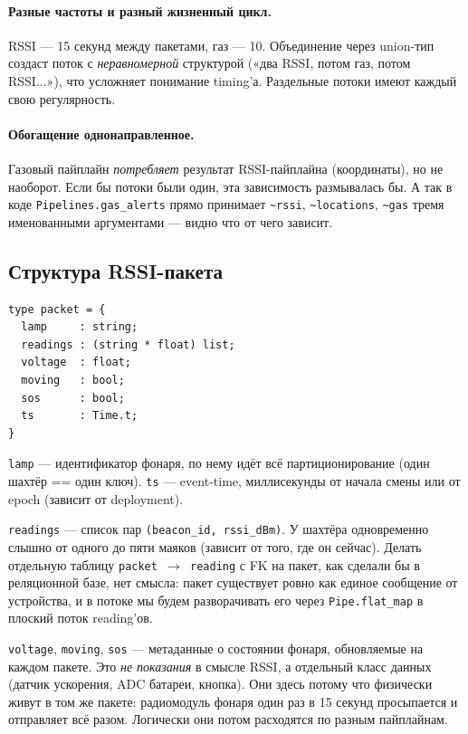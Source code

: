 \paragraph{Разные частоты и разный жизненный цикл.} RSSI --- 15 секунд
между пакетами, газ --- 10. Объединение через union-тип создаст
поток с \emph{неравномерной} структурой («два RSSI, потом газ, потом
RSSI...»), что усложняет понимание timing'а. Раздельные потоки имеют
каждый свою регулярность.

\paragraph{Обогащение однонаправленное.} Газовый пайплайн
\emph{потребляет} результат RSSI-пайплайна (координаты), но не
наоборот. Если бы потоки были один, эта зависимость размывалась бы.
А так в коде \texttt{Pipelines.gas\_alerts} прямо принимает
\texttt{\textasciitilde rssi}, \texttt{\textasciitilde locations},
\texttt{\textasciitilde gas} тремя именованными аргументами ---
видно что от чего зависит.

\subsection{Структура RSSI-пакета}

\begin{lstlisting}
type packet = {
  lamp     : string;
  readings : (string * float) list;
  voltage  : float;
  moving   : bool;
  sos      : bool;
  ts       : Time.t;
}
\end{lstlisting}

\texttt{lamp} --- идентификатор фонаря, по нему идёт всё
партиционирование (один шахтёр == один ключ). \texttt{ts} ---
event-time, миллисекунды от начала смены или от epoch (зависит от
deployment).

\texttt{readings} --- список пар \texttt{(beacon\_id, rssi\_dBm)}. У
шахтёра одновременно слышно от одного до пяти маяков (зависит от
того, где он сейчас). Делать отдельную таблицу
\texttt{packet $\to$ reading} с FK на пакет, как сделали бы в
реляционной базе, нет смысла: пакет существует ровно как единое
сообщение от устройства, и в потоке мы будем разворачивать его
через \texttt{Pipe.flat\_map} в плоский поток reading'ов.

\texttt{voltage}, \texttt{moving}, \texttt{sos} --- метаданные о
состоянии фонаря, обновляемые на каждом пакете. Это \emph{не
показания} в смысле RSSI, а отдельный класс данных (датчик
ускорения, ADC батареи, кнопка). Они здесь потому что физически
живут в том же пакете: радиомодуль фонаря один раз в 15 секунд
просыпается и отправляет всё разом. Логически они потом
расходятся по разным пайплайнам.

